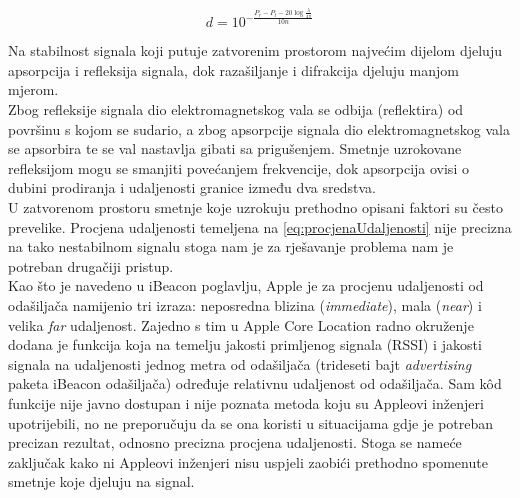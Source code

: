 \begin{equation}
	\label{eq:procjenaUdaljenosti}
	d = 10^{-\frac{P_r - P_t - 20\log{\frac{\lambda}{4\pi}}}{10n}}
\end{equation}


Na stabilnost signala koji putuje zatvorenim prostorom najvećim dijelom djeluju apsorpcija i refleksija signala, dok razašiljanje i difrakcija djeluju manjom mjerom.
\\
Zbog refleksije signala dio elektromagnetskog vala se odbija (reflektira) od površinu s kojom se sudario, a zbog apsorpcije signala dio elektromagnetskog vala se apsorbira te se val nastavlja gibati sa prigušenjem. 
Smetnje uzrokovane refleksijom mogu se smanjiti povećanjem frekvencije, dok apsorpcija ovisi o dubini prodiranja i udaljenosti granice između dva sredstva. 
\\

U zatvorenom prostoru smetnje koje uzrokuju prethodno opisani faktori su često prevelike. 
Procjena udaljenosti temeljena na \eqref{eq:procjenaUdaljenosti} nije precizna na tako nestabilnom signalu stoga nam je za rješavanje problema nam je potreban drugačiji pristup.
\\

Kao što je navedeno u iBeacon poglavlju, Apple je za procjenu udaljenosti od odašiljača namijenio tri izraza: neposredna blizina (\textit{immediate}), mala (\textit{near}) i velika \textit{far} udaljenost.
Zajedno s tim u Apple Core Location radno okruženje dodana je funkcija koja na temelju jakosti primljenog signala (RSSI) i jakosti signala na udaljenosti jednog metra od odašiljača (trideseti bajt \textit{advertising} paketa iBeacon odašiljača) određuje relativnu udaljenost od odašiljača. 
Sam kôd funkcije nije javno dostupan i nije poznata metoda koju su Appleovi inženjeri upotrijebili, no ne preporučuju da se ona koristi u situacijama gdje je potreban precizan rezultat, odnosno precizna procjena udaljenosti. 
Stoga se nameće zaključak kako ni Appleovi inženjeri nisu uspjeli zaobići prethodno spomenute smetnje koje djeluju na signal.
\\
  



